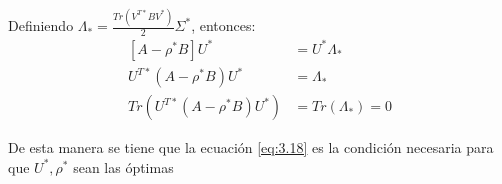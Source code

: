 Definiendo $\Lambda_* = \frac{Tr(V^{T*} B V^*)}{2}\Sigma^*$, entonces:
\begin{equation}\label{eq:3.18}
\begin{aligned}
\left[ A-\rho^* B\right]U^*   &= U^* \Lambda_* \\
 U^{T*} \left(A-\rho^* B\right)U^*   &=  \Lambda_* \\
 Tr(U^{T*} \left(A-\rho^* B\right)U^*)   &=  Tr(\Lambda_*) = 0
\end{aligned}
\end{equation}  

De esta manera se tiene que la ecuación \ref{eq:3.18} es la condición necesaria para que $U^*, \rho^*$ sean las óptimas









